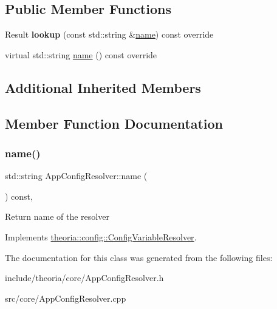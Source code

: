\subsection*{Public Member Functions}
\begin{DoxyCompactItemize}
\item 
\mbox{\label{classtheoria_1_1core_1_1AppConfigResolver_a7922df9559e63ccd91db5177224823fc}} 
Result {\bfseries lookup} (const std\+::string \&\hyperlink{classtheoria_1_1core_1_1AppConfigResolver_ad7c8c08e622613c6505418774a71abda}{name}) const override
\item 
virtual std\+::string \hyperlink{classtheoria_1_1core_1_1AppConfigResolver_ad7c8c08e622613c6505418774a71abda}{name} () const override
\end{DoxyCompactItemize}
\subsection*{Additional Inherited Members}


\subsection{Member Function Documentation}
\mbox{\label{classtheoria_1_1core_1_1AppConfigResolver_ad7c8c08e622613c6505418774a71abda}} 
\subsubsection{\texorpdfstring{name()}{name()}}
{\footnotesize\ttfamily std\+::string App\+Config\+Resolver\+::name (\begin{DoxyParamCaption}{ }\end{DoxyParamCaption}) const\hspace{0.3cm}{\ttfamily [override]}, {\ttfamily [virtual]}}

Return name of the resolver 

Implements \hyperlink{classtheoria_1_1config_1_1ConfigVariableResolver_a026bda729faf988eaef334a45ec92303}{theoria\+::config\+::\+Config\+Variable\+Resolver}.



The documentation for this class was generated from the following files\+:\begin{DoxyCompactItemize}
\item 
include/theoria/core/App\+Config\+Resolver.\+h\item 
src/core/App\+Config\+Resolver.\+cpp\end{DoxyCompactItemize}
